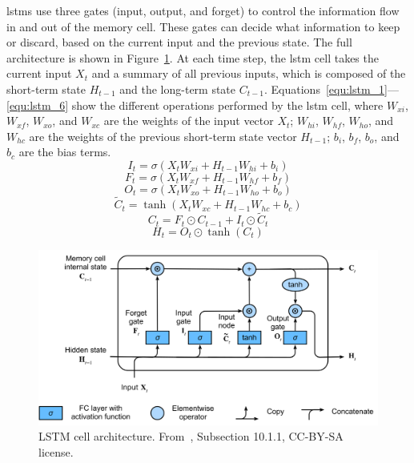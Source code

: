 \acrshort{lstm}s use three gates (input, output, and forget) to control the information flow in and out of the memory cell. These gates can decide what information to keep or discard, based on the current input and the previous state. The full architecture is shown in Figure~\ref{fig:lstm_architecture}. At each time step, the \acrshort{lstm} cell takes the current input $X_t$ and a summary of all previous inputs, which is composed of the short-term state $H_{t-1}$ and the long-term state $C_{t-1}$. Equations~\eqref{equ:lstm_1}---\eqref{equ:lstm_6} show the different operations performed by the \acrshort{lstm} cell, where $W_{xi}$, $W_{xf}$, $W_{xo}$, and $W_{xc}$ are the weights of the input vector $X_t$; $W_{hi}$, $W_{hf}$, $W_{ho}$, and $W_{hc}$ are the weights of the previous short-term state vector $H_{t-1}$; $b_i$, $b_f$, $b_o$, and $b_c$ are the bias terms.
\begin{equation}\label{equ:lstm_1}
I_t = \sigma(X_{t}W_{xi} + H_{t-1}W_{hi} + b_{i})
\end{equation}
\begin{equation}\label{equ:lstm_2}
F_t = \sigma(X_{t}W_{xf} + H_{t-1}W_{hf} + b_{f})
\end{equation}
\begin{equation}\label{equ:lstm_4}
O_t = \sigma(X_{t}W_{xo} + H_{t-1}W_{ho} + b_{o})
\end{equation}
\begin{equation}\label{equ:lstm_3}
\tilde{C}_t = \tanh(X_{t}W_{xc} + H_{t-1}W_{hc} + b_{c})
\end{equation}
\begin{equation}\label{equ:lstm_5}
C_t = F_t \odot C_{t-1} + I_t \odot \tilde{C}_t
\end{equation}
\begin{equation}\label{equ:lstm_6}
H_t = O_t \odot \tanh(C_t)
\end{equation}

\begin{figure}
    \centering
    \includegraphics[width=.65\linewidth]{images/lstm.png}
    \caption[LSTM cell architecture]{LSTM cell architecture. From~\cite{zhang_dive_2023}, Subsection 10.1.1, CC-BY-SA license.}
    \label{fig:lstm_architecture}
\end{figure}

